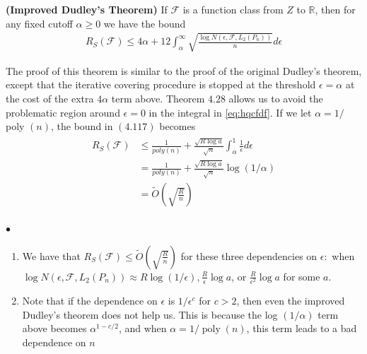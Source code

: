 \documentclass{article}
\newcommand{\bfs}[1]{\textbf{({#1}) }}
\begin{document}
\begin{thma}\bfs{Improved Dudley's Theorem}
 If $\mathcal{F}$ is a function class from $Z$ to $\mathbb{R}$, then for any fixed cutoff $\alpha \geq 0$ we have the bound
\begin{align*}
R_{S}(\mathcal{F}) \leq 4 \alpha+12 \int_{\alpha}^{\infty} \sqrt{\frac{\log N\left(\epsilon, \mathcal{F}, L_{2}\left(P_{n}\right)\right)}{n}} d \epsilon
\end{align*}
\end{thma} 
\begin{rema}
The proof of this theorem is similar to the proof of the original Dudley's theorem, except that the iterative covering procedure is stopped at the threshold $\epsilon=\alpha$ at the cost of the extra $4 \alpha$ term above. Theorem $4.28$ allows us to avoid the problematic region around $\epsilon=0$ in the integral in \cref{eq:hqcfdf}. If we let $\alpha=1 /$ poly $(n)$, the bound in $(4.117)$ becomes
\begin{align*}
\begin{aligned}
R_{S}(\mathcal{F}) & \leq \frac{1}{p o l y(n)}+\frac{\sqrt{R \log a}}{\sqrt{n}} \int_{\alpha}^{1} \frac{1}{\epsilon} d \epsilon \\
&=\frac{1}{p o l y(n)}+\frac{\sqrt{R \log a}}{\sqrt{n}} \log (1 / \alpha) \\
&=\widetilde{O}\left(\sqrt{\frac{R}{n}}\right)
\end{aligned}
\end{align*}
\end{rema}

$\bullet$   
\begin{enumerate}
    \item We have that $R_{S}(\mathcal{F}) \leq \widetilde{O}\left(\sqrt{\frac{R}{n}}\right)$ for these three dependencies on $\epsilon:$ when $\log N\left(\epsilon, \mathcal{F}, L_{2}\left(P_{n}\right)\right) \approx R \log (1 / \epsilon), \frac{R}{\epsilon} \log a$, or $\frac{R}{\epsilon^{2}} \log a$ for some $a$.
    \item Note that if the dependence on $\epsilon$ is $1 / \epsilon^{c}$ for $c>2$, then even the improved Dudley's theorem does not help us. This is because the log $(1 / \alpha)$ term above becomes $\alpha^{1-c / 2}$, and when $\alpha=1 / \operatorname{poly}(n)$, this term leads to a bad dependence on $n$
\end{enumerate}
\end{document}
